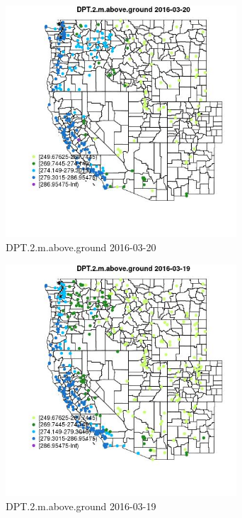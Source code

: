 \begin{figure} 
\centering  
\includegraphics[width=0.77\textwidth]{Code_Outputs/Report_ML_input_PM25_Step4_part_e_de_duplicated_aveswNAs_MapObsDPT2maboveground2016-03-20.jpg} 
\caption{\label{fig:Report_ML_input_PM25_Step4_part_e_de_duplicated_aveswNAsMapObsDPT2maboveground2016-03-20}DPT.2.m.above.ground 2016-03-20} 
\end{figure} 
 

\begin{figure} 
\centering  
\includegraphics[width=0.77\textwidth]{Code_Outputs/Report_ML_input_PM25_Step4_part_e_de_duplicated_aveswNAs_MapObsDPT2maboveground2016-03-19.jpg} 
\caption{\label{fig:Report_ML_input_PM25_Step4_part_e_de_duplicated_aveswNAsMapObsDPT2maboveground2016-03-19}DPT.2.m.above.ground 2016-03-19} 
\end{figure} 
 

